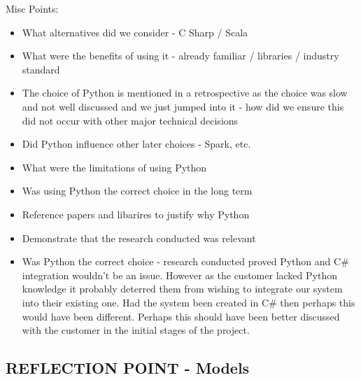 \documentclass{l3proj}
\begin{document}
Misc Points:
\begin{itemize}
\item What alternatives did we consider - C Sharp / Scala
\item What were the benefits of using it - already familiar / libraries / industry standard
\item The choice of Python is mentioned in a retrospective as the choice was slow and not well discussed and we just jumped into it - how did we ensure this did not occur with other major technical decisions
\item Did Python influence other later choices - Spark, etc.
\item What were the limitations of using Python
\item Was using Python the correct choice in the long term 
\item Reference papers and libarires to justify why Python 
\item Demonstrate that the research conducted was relevant
\item Was Python the correct choice - research conducted proved Python and C\# integration wouldn't be an issue. However as the customer lacked Python knowledge it probably deterred them from wishing to integrate our system into their existing one. Had the system been created in C\# then perhaps this would have been different. Perhaps this should have been better discussed with the customer in the initial stages of the project.
\end{itemize}


\subsection{REFLECTION POINT - Models}
\label{sec:modelreflection}
\end{document}

